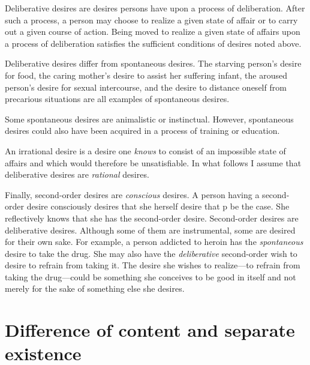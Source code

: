\documentclass[output=paper,colorlinks,citecolor=brown
]{langscibook}
\begin{document}
Deliberative desires are desires persons have upon a process of deliberation. After such a process, a person may choose to realize a given state of affair or to carry out a given course of action. Being moved to realize a given state of affairs upon a process of deliberation satisfies the sufficient conditions of desires noted above. 

Deliberative desires differ from spontaneous desires. The starving person's desire for food, the caring mother's desire to assist her suffering infant, the aroused person's desire for sexual intercourse, and the desire to distance oneself from precarious situations are all examples of spontaneous desires.

Some spontaneous desires are animalistic or instinctual. However, spontaneous desires could also have been acquired in a process of training or education. 

An irrational desire is a desire one \textit{knows} to consist of an impossible state of affairs and which would therefore be unsatisfiable. In what follows I assume that deliberative desires are \textit{rational} desires.

Finally, second-order desires are \textit{conscious} desires. A person having a second-order desire consciously desires that she herself desire that p be the case. She reflectively knows that she has the second-order desire. Second-order desires are deliberative desires. Although some of them are instrumental, some are desired for their own sake. For example, a person addicted to heroin has the \textit{spontaneous} desire to take the drug. She may also have the \textit{deliberative} second-order wish to desire to refrain from taking it. The desire she wishes to realize—to refrain from taking the drug—could be something she conceives to be good in itself and not merely for the sake of something else she desires.

\section{Difference of content and separate existence}
\end{document}
